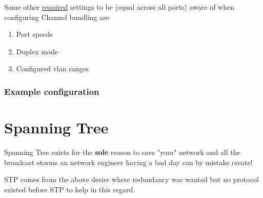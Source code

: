 \documentclass[a4paper,12pt,twoside,twocolumn]{book}
\begin{document}
Some other \underline{required} settings to be (equal across all ports) aware of when configuring Channel bundling are
\begin{enumerate}
    \item Port speeds
    \item Duplex mode
    \item Configured vlan ranges
\end{enumerate}

\subsubsection{Example configuration}



\newpage
\section{Spanning Tree}

Spanning Tree exists for the \textbf{sole} reason to save "your" network and all the broadcast storms an network engineer having a bad day can by mistake create!

STP comes from the above desire where redundancy was wanted but no protocol existed before STP to help in this regard.

\begin{table}[h]
	\centering
	\caption{Spanning Tree standrds}
	\label{stpstandards}
\end{table}
\end{document}
